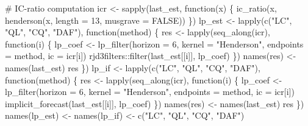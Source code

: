 \documentclass[
]{article}
\newenvironment{Shaded}{\begin{snugshade}}{\end{snugshade}}
\newcommand{\AttributeTok}[1]{\textcolor[rgb]{0.40,0.45,0.13}{#1}}
\newcommand{\CommentTok}[1]{\textcolor[rgb]{0.37,0.37,0.37}{#1}}
\newcommand{\ConstantTok}[1]{\textcolor[rgb]{0.56,0.35,0.01}{#1}}
\newcommand{\ControlFlowTok}[1]{\textcolor[rgb]{0.00,0.23,0.31}{#1}}
\newcommand{\DecValTok}[1]{\textcolor[rgb]{0.68,0.00,0.00}{#1}}
\newcommand{\FunctionTok}[1]{\textcolor[rgb]{0.28,0.35,0.67}{#1}}
\newcommand{\NormalTok}[1]{\textcolor[rgb]{0.00,0.23,0.31}{#1}}
\newcommand{\OtherTok}[1]{\textcolor[rgb]{0.00,0.23,0.31}{#1}}
\newcommand{\SpecialCharTok}[1]{\textcolor[rgb]{0.37,0.37,0.37}{#1}}
\newcommand{\StringTok}[1]{\textcolor[rgb]{0.13,0.47,0.30}{#1}}
\newcommand\1{\mathds{1}}
\begin{document}
\begin{Shaded}
\begin{Highlighting}[]
\CommentTok{\# IC{-}ratio computation}
\NormalTok{icr }\OtherTok{\textless{}{-}} \FunctionTok{sapply}\NormalTok{(last\_est, }\ControlFlowTok{function}\NormalTok{(x) \{}
  \FunctionTok{ic\_ratio}\NormalTok{(x, }\FunctionTok{henderson}\NormalTok{(x, }\AttributeTok{length =} \DecValTok{13}\NormalTok{, }\AttributeTok{musgrave =} \ConstantTok{FALSE}\NormalTok{))}
\NormalTok{\})}
\NormalTok{lp\_est }\OtherTok{\textless{}{-}} \FunctionTok{lapply}\NormalTok{(}\FunctionTok{c}\NormalTok{(}\StringTok{"LC"}\NormalTok{, }\StringTok{"QL"}\NormalTok{, }\StringTok{"CQ"}\NormalTok{, }\StringTok{"DAF"}\NormalTok{), }\ControlFlowTok{function}\NormalTok{(method) \{}
\NormalTok{  res }\OtherTok{\textless{}{-}} \FunctionTok{lapply}\NormalTok{(}\FunctionTok{seq\_along}\NormalTok{(icr), }\ControlFlowTok{function}\NormalTok{(i) \{}
\NormalTok{    lp\_coef }\OtherTok{\textless{}{-}} \FunctionTok{lp\_filter}\NormalTok{(}\AttributeTok{horizon =} \DecValTok{6}\NormalTok{,}
                         \AttributeTok{kernel =} \StringTok{"Henderson"}\NormalTok{,}
                         \AttributeTok{endpoints =}\NormalTok{ method,}
                         \AttributeTok{ic =}\NormalTok{ icr[i])}
\NormalTok{    rjd3filters}\SpecialCharTok{::}\FunctionTok{filter}\NormalTok{(last\_est[[i]], lp\_coef)}
\NormalTok{  \})}
  \FunctionTok{names}\NormalTok{(res) }\OtherTok{\textless{}{-}} \FunctionTok{names}\NormalTok{(last\_est)}
\NormalTok{  res}
\NormalTok{\})}
\NormalTok{lp\_if }\OtherTok{\textless{}{-}} \FunctionTok{lapply}\NormalTok{(}\FunctionTok{c}\NormalTok{(}\StringTok{"LC"}\NormalTok{, }\StringTok{"QL"}\NormalTok{, }\StringTok{"CQ"}\NormalTok{, }\StringTok{"DAF"}\NormalTok{), }\ControlFlowTok{function}\NormalTok{(method) \{}
\NormalTok{  res }\OtherTok{\textless{}{-}} \FunctionTok{lapply}\NormalTok{(}\FunctionTok{seq\_along}\NormalTok{(icr), }\ControlFlowTok{function}\NormalTok{(i) \{}
\NormalTok{    lp\_coef }\OtherTok{\textless{}{-}} \FunctionTok{lp\_filter}\NormalTok{(}\AttributeTok{horizon =} \DecValTok{6}\NormalTok{,}
                         \AttributeTok{kernel =} \StringTok{"Henderson"}\NormalTok{,}
                         \AttributeTok{endpoints =}\NormalTok{ method,}
                         \AttributeTok{ic =}\NormalTok{ icr[i])}
    \FunctionTok{implicit\_forecast}\NormalTok{(last\_est[[i]], lp\_coef)}
\NormalTok{  \})}
  \FunctionTok{names}\NormalTok{(res) }\OtherTok{\textless{}{-}} \FunctionTok{names}\NormalTok{(last\_est)}
\NormalTok{  res}
\NormalTok{\})}
\FunctionTok{names}\NormalTok{(lp\_est) }\OtherTok{\textless{}{-}} \FunctionTok{names}\NormalTok{(lp\_if) }\OtherTok{\textless{}{-}}  \FunctionTok{c}\NormalTok{(}\StringTok{"LC"}\NormalTok{, }\StringTok{"QL"}\NormalTok{, }\StringTok{"CQ"}\NormalTok{, }\StringTok{"DAF"}\NormalTok{)}


\end{Highlighting}
\end{Shaded}
\end{document}
